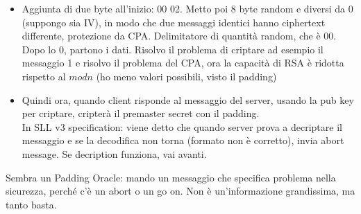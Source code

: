 \documentclass[16px]{article}
\begin{document}
\begin{itemize}
\item Aggiunta di due byte all'inizio: 00 02. Metto poi 8 byte random e diversi da 0 (suppongo sia IV), in modo che due messaggi identici hanno ciphertext differente, protezione da CPA. Delimitatore di quantità random, che è 00. Dopo lo 0, partono i dati. Risolvo il problema di criptare ad esempio il messaggio 1 e risolvo il problema del CPA, ora la capacità di RSA è ridotta rispetto al $modn$ (ho meno valori possibili, visto il padding)
\item Quindi ora, quando client risponde al messaggio del server, usando la pub key per criptare, cripterà il premaster secret con il padding.\\ In SLL v3 specification: viene detto che quando server prova a decriptare il messaggio e se la decodifica non torna (formato non è corretto), invia abort message. Se decription funziona, vai avanti.
\end{itemize}
Sembra un Padding Oracle: mando un messaggio che specifica problema nella sicurezza, perché c'è un abort o un go on. Non è un'informazione grandissima, ma tanto basta.
\end{document}
